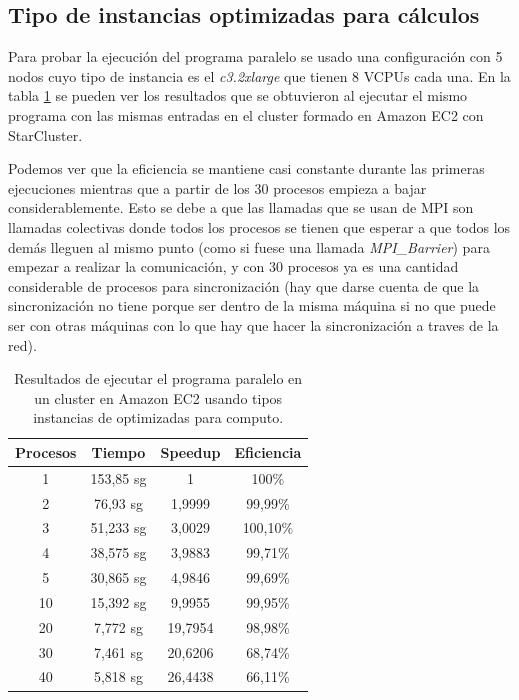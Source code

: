 \documentclass{article}
\begin{document}
\subsection{Tipo de instancias optimizadas para cálculos}\label{sec:ejC3}
	Para probar la ejecución del programa paralelo se usado una configuración con 5 nodos cuyo tipo de instancia es el \emph{c3.2xlarge} que tienen 8 VCPUs cada una. En la tabla \ref{tab:resultadosClusterC} se pueden ver los resultados que se obtuvieron al ejecutar el mismo programa con las mismas entradas en el cluster formado en Amazon EC2 con StarCluster.

	Podemos ver que la eficiencia se mantiene casi constante durante las primeras ejecuciones mientras que  a partir de los 30 procesos empieza a bajar considerablemente. Esto se debe a que las llamadas que se usan de MPI son llamadas colectivas donde todos los procesos se tienen que esperar a que todos los demás lleguen al mismo punto (como si fuese una llamada \emph{MPI\_Barrier}) para empezar a realizar la comunicación, y con 30 procesos ya es una cantidad considerable de procesos para sincronización (hay que darse cuenta de que la sincronización no tiene porque ser dentro de la misma máquina si no que puede ser con otras máquinas con lo que hay que hacer la sincronización a traves de la red).

\begin{table}[h]
	\begin{center}
		\caption{Resultados de ejecutar el programa paralelo en un cluster en Amazon EC2 usando tipos instancias de optimizadas para computo.}
		\begin{tabular}{|c|c|c|c|}
\hline
\textbf{Procesos} &
\textbf{Tiempo} &
\textbf{Speedup} &
\textbf{Eficiencia} \\ \hline
\hline
 1 &153,85 sg &  1          & 100\% \\ \hline
 2 & 76,93 sg &  1,9999 & 99,99\% \\ \hline 
 3 & 51,233 sg &  3,0029 & 100,10\% \\ \hline 
 4 & 38,575 sg &  3,9883 & 99,71\% \\ \hline
 5 & 30,865 sg &  4,9846 & 99,69\% \\ \hline
10 & 15,392 sg &  9,9955 & 99,95\% \\ \hline
20 & 7,772 sg & 19,7954 & 98,98\% \\ \hline
30 & 7,461 sg &  20,6206& 68,74\% \\ \hline
40 & 5,818 sg & 26,4438 & 66,11\% \\ \hline
		\end{tabular}
		\label{tab:resultadosClusterC}
	\end{center}
\end{table}
\end{document}
